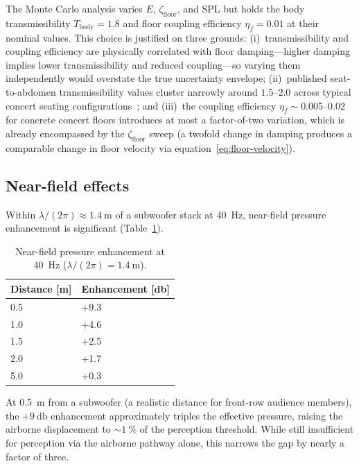 The Monte Carlo analysis varies $E$, $\zeta_\mathrm{floor}$, and SPL but
holds the body transmissibility $T_\mathrm{body} = 1.8$ and floor
coupling efficiency $\eta_f = 0.01$ at their nominal values.  This
choice is justified on three grounds: (i)~transmissibility and coupling
efficiency are physically correlated with floor damping---higher damping
implies lower transmissibility and reduced coupling---so varying them
independently would overstate the true uncertainty envelope;
(ii)~published seat-to-abdomen transmissibility values cluster narrowly
around $1.5$--$2.0$ across typical concert seating
configurations~\cite{Griffin1990, Kitazaki1998}; and (iii)~the coupling
efficiency $\eta_f \sim 0.005$--$0.02$ for concrete concert floors
introduces at most a factor-of-two variation, which is already
encompassed by the $\zeta_\mathrm{floor}$ sweep (a twofold change in
damping produces a comparable change in floor velocity via
equation~\ref{eq:floor-velocity}).

\subsection{Near-field effects}
\label{sec:near-field-results}

Within $\lambda/(2\pi) \approx \SI{1.4}{\metre}$ of a subwoofer stack
at \SI{40}{\hertz}, near-field pressure enhancement is significant
(Table~\ref{tab:near-field}).

\begin{table}[htbp]
  \centering
  \caption{Near-field pressure enhancement at \SI{40}{\hertz}
    ($\lambda/(2\pi) = \SI{1.4}{\metre}$).}
  \label{tab:near-field}
  \begin{tabular}{@{}ll@{}}
    \toprule
    Distance [\si{\metre}] & Enhancement [\si{\decibel}] \\
    \midrule
    0.5 & +9.3 \\
    1.0 & +4.6 \\
    1.5 & +2.5 \\
    2.0 & +1.7 \\
    5.0 & +0.3 \\
    \bottomrule
  \end{tabular}
\end{table}

At \SI{0.5}{\metre} from a subwoofer (a realistic distance for front-row
audience members), the $+\SI{9}{\decibel}$ enhancement approximately
triples the effective pressure, raising the airborne displacement to
${\sim}\SI{1}{\percent}$ of the perception threshold.  While still
insufficient for perception via the airborne pathway alone, this
narrows the gap by nearly a factor of three.

